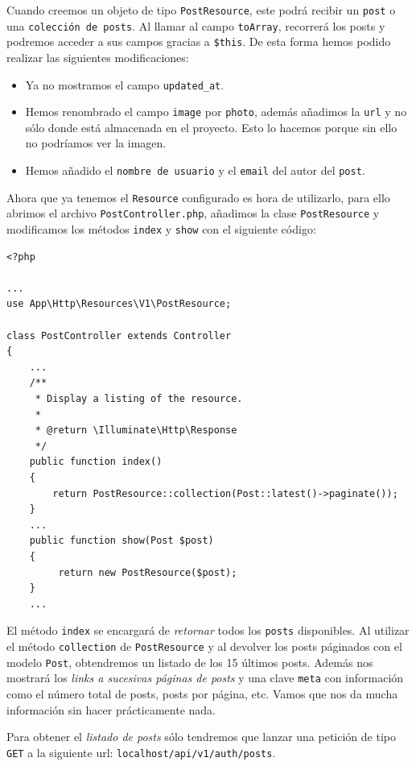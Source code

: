 \documentclass[11pt]{article}
\begin{document}
Cuando creemos un objeto de tipo \texttt{PostResource}, este podrá recibir un
\texttt{post} o una \texttt{colección de posts}. Al llamar al campo \texttt{toArray}, recorrerá
los posts y podremos acceder a sus campos gracias a \texttt{\$this}. De esta
forma hemos podido realizar las siguientes modificaciones:
\begin{itemize}
\item Ya no mostramos el campo \texttt{updated\_at}.
\item Hemos renombrado el campo \texttt{image} por \texttt{photo}, además añadimos la
\texttt{url} y no sólo donde está almacenada en el proyecto. Esto lo hacemos
porque sin ello no podríamos ver la imagen.
\item Hemos añadido el \texttt{nombre de usuario} y el \texttt{email} del autor del \texttt{post}.
\end{itemize}

Ahora que ya tenemos el \texttt{Resource} configurado es hora de utilizarlo,
para ello abrimos el archivo \texttt{PostController.php}, añadimos la clase
\texttt{PostResource} y modificamos los métodos \texttt{index} y \texttt{show} con el siguiente
código:
\begin{verbatim}
<?php

...
use App\Http\Resources\V1\PostResource;

class PostController extends Controller
{
    ...
    /**
     * Display a listing of the resource.
     *
     * @return \Illuminate\Http\Response
     */
    public function index()
    {
        return PostResource::collection(Post::latest()->paginate());
    }
    ...
    public function show(Post $post)
    {
         return new PostResource($post);
    }
    ...
\end{verbatim}

El método \texttt{index} se encargará de \emph{retornar} todos los \texttt{posts}
disponibles. Al utilizar el método \texttt{collection} de \texttt{PostResource} y al
devolver los posts páginados con el modelo \texttt{Post}, obtendremos un
listado de los 15 últimos posts. Además nos mostrará los \emph{links a
sucesivas páginas de posts} y una clave \texttt{meta} con información como el
número total de posts, posts por página, etc. Vamos que nos da mucha
información sin hacer prácticamente nada.

Para obtener el \emph{listado de posts} sólo tendremos que lanzar una
petición de tipo \texttt{GET} a la siguiente url: \texttt{localhost/api/v1/auth/posts}.
\end{document}
